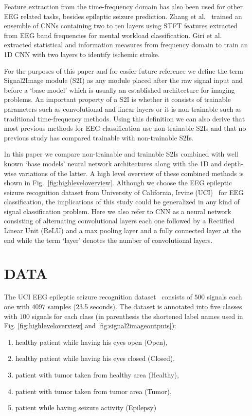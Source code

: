 \documentclass[conference]{IEEEtran}
\begin{document}
Feature extraction from the time-frequency domain has also been used for other EEG related tasks, besides epileptic seizure prediction.
Zhang et al.~\cite{zhang2017pattern} trained an ensemble of CNNs containing two to ten layers using STFT features extracted from EEG band frequencies for mental workload classification.
Giri et al.~\cite{giri2016ischemic} extracted statistical and information measures from frequency domain to train an 1D CNN with two layers to identify ischemic stroke.

For the purposes of this paper and for easier future reference we define the term Signal2Image module (S2I) as any module placed after the raw signal input and before a `base model' which is usually an established architecture for imaging problems.
An important property of a S2I is whether it consists of trainable parameters such as convolutional and linear layers or it is non-trainable such as traditional time-frequency methods.
Using this definition we can also derive that most previous methods for EEG classification use non-trainable S2Is and that no previous study has compared trainable with non-trainable S2Is.

In this paper we compare non-trainable and trainable S2Is combined with well known `base models' neural network architectures along with the 1D and depth-wise variations of the latter.
A high level overview of these combined methods is shown in Fig.~\ref{fig:highleveloverview}.
Although we choose the EEG epileptic seizure recognition dataset from University of California, Irvine (UCI)~\cite{andrzejak2001indications} for EEG classification, the implications of this study could be generalized in any kind of signal classification problem.
Here we also refer to CNN as a neural network consisting of alternating convolutional layers each one followed by a Rectified Linear Unit (ReLU) and a max pooling layer and a fully connected layer at the end while the term `layer' denotes the number of convolutional layers.

\section{DATA}
The UCI EEG epileptic seizure recognition dataset~\cite{andrzejak2001indications} consists of $500$ signals each one with $4097$ samples (23.5 seconds).
The dataset is annotated into five classes with $100$ signals for each class (in parenthesis the shortened label names used in Fig. \ref{fig:highleveloverview} and \ref{fig:signal2imageoutputs}):
\begin{enumerate}
	\item healthy patient while having his eyes open (Open),
	\item healthy patient while having his eyes closed (Closed),
	\item patient with tumor taken from healthy area (Healthy),
	\item patient with tumor taken from tumor area (Tumor),
	\item patient while having seizure activity (Epilepsy)
\end{enumerate}
\end{document}
